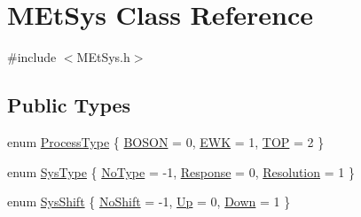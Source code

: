 \hypertarget{classMEtSys}{
\section{MEtSys Class Reference}
\label{classMEtSys}
}


{\ttfamily \#include $<$MEtSys.h$>$}\subsection*{Public Types}
\begin{DoxyCompactItemize}
\item 
enum \hyperlink{classMEtSys_afab2b6468da059ee0d9c8471ea7e7018}{ProcessType} \{ \hyperlink{classMEtSys_afab2b6468da059ee0d9c8471ea7e7018a9c1abe56956a6b876cb4c9ce6b06c90e}{BOSON} = 0, 
\hyperlink{classMEtSys_afab2b6468da059ee0d9c8471ea7e7018a5c42e7fcbbda18b3b0214e7b3950946c}{EWK} = 1, 
\hyperlink{classMEtSys_afab2b6468da059ee0d9c8471ea7e7018a638e7ed171fc2a7dc9948677651115db}{TOP} = 2
 \}
\item 
enum \hyperlink{classMEtSys_ade79c833dae227147e7a69c89b190cb1}{SysType} \{ \hyperlink{classMEtSys_ade79c833dae227147e7a69c89b190cb1a40e1010876cb51cfde0f84459c698229}{NoType} = -\/1, 
\hyperlink{classMEtSys_ade79c833dae227147e7a69c89b190cb1a1fd579dea12da28ae73e97d8576ba085}{Response} = 0, 
\hyperlink{classMEtSys_ade79c833dae227147e7a69c89b190cb1ad27d4ad379b232ecce936dc70f9b1e7b}{Resolution} = 1
 \}
\item 
enum \hyperlink{classMEtSys_ab7a2f541cbd603695f3fdf6c52f826b3}{SysShift} \{ \hyperlink{classMEtSys_ab7a2f541cbd603695f3fdf6c52f826b3a3182462bbd1e56e2b1a2240348f51501}{NoShift} = -\/1, 
\hyperlink{classMEtSys_ab7a2f541cbd603695f3fdf6c52f826b3a9b04c12dd84d31ee032a390725233d48}{Up} = 0, 
\hyperlink{classMEtSys_ab7a2f541cbd603695f3fdf6c52f826b3a098972c6837721650242936a4d0eef66}{Down} = 1
 \}
\end{DoxyCompactItemize}
